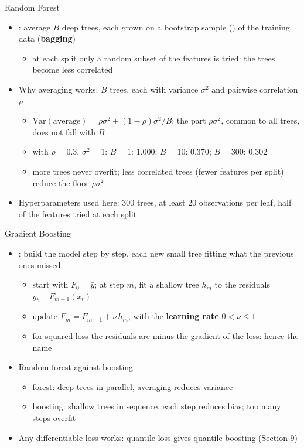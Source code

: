 \begin{frame}{Random Forest}
\itemsize{\small}
\begin{itemize}
    \item {}: average $B$ deep trees, each grown on a bootstrap sample () of the training data (\textbf{bagging})
    \begin{itemize}
        \item at each split only a random subset of the features is tried: the trees become less correlated
    \end{itemize}
    \item Why averaging works: $B$ trees, each with variance $\sigma^2$ and pairwise correlation $\rho$
    \begin{itemize}
        \item $\mathrm{Var}(\text{average}) = \rho\sigma^2 + (1 - \rho)\sigma^2/B$: the part $\rho\sigma^2$, common to all trees, does not fall with $B$
        \item with $\rho = 0.3$, $\sigma^2 = 1$: $B = 1$: $1.000$; $B = 10$: $0.370$; $B = 300$: $0.302$
        \item more trees never overfit; less correlated trees (fewer features per split) reduce the floor $\rho\sigma^2$
    \end{itemize}
    \item Hyperparameters used here: 300 trees, at least 20 observations per leaf, half of the features tried at each split
\end{itemize}
\end{frame}

\begin{frame}{Gradient Boosting}
\itemsize{\small}
\begin{itemize}
    \item {}: build the model step by step, each new small tree fitting what the previous ones missed
    \begin{itemize}
        \item start with $F_0 = \bar y$; at step $m$, fit a shallow tree $h_m$ to the residuals $y_t - F_{m-1}(x_t)$
        \item update $F_m = F_{m-1} + \nu\, h_m$, with the \textbf{learning rate} $0 < \nu \le 1$
        \item for squared loss the residuals are minus the gradient of the loss: hence the name
    \end{itemize}
    \item Random forest against boosting
    \begin{itemize}
        \item forest: deep trees in parallel, averaging reduces variance
        \item boosting: shallow trees in sequence, each step reduces bias; too many steps overfit
    \end{itemize}
    \item Any differentiable loss works: quantile loss gives quantile boosting (Section 9)
\end{itemize}
\end{frame}

